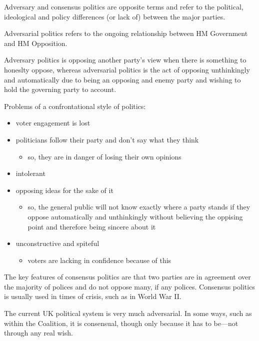 \documentclass[a4paper,12pt]{article}
\begin{document}
Adversary and consensus politics are opposite terms and refer to the political, ideological and policy differences (or lack of) between the major parties.

Adversarial politics refers to the ongoing relationship between HM Government and HM Opposition.

\begin{enumerate}
	\item{Adversary politics is opposing another party's view when there is something to honeslty oppose, whereas adversarial politics is the act of opposing unthinkingly and automatically due to being an opposing and enemy party and wishing to hold the governing party to account.}
	\item{Problems of a confrontational style of politics:
		\begin{itemize}
			\item{voter engagement is lost}
			\item{politicians follow their party and don't say what they think}
			\begin{itemize}
				\item{so, they are in danger of losing their own opinions}
			\end{itemize}
			\item{intolerant}
			\item{opposing ideas for the sake of it}
			\begin{itemize}
				\item{so, the general public will not know exactly where a party stands if they oppose automatically and unthinkingly without believing the oppising point and therefore being sincere about it}
			\end{itemize}
			\item{unconstructive and spiteful}
			\begin{itemize}
				\item{voters are lacking in confidence because of this}
			\end{itemize}
		\end{itemize}
	\item{The key features of consensus politics are that two parties are in agreement over the majority of polices and do not oppose many, if any polices.  Consensus politics is usually used in times of crisis, such as in World War II.}
	\item{The current UK political system is very much adversarial.  In some ways, such as within the Coalition, it is consensual, though only because it has to be---not through any real wish.}
	}
\end{enumerate}
\end{document}
